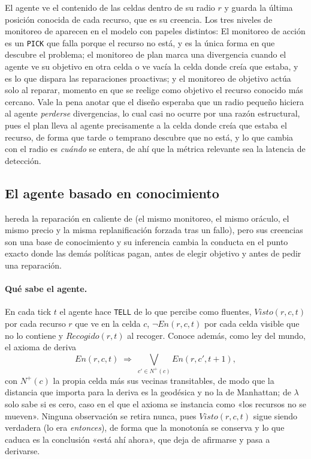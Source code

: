 El agente ve el contenido de las celdas dentro de su radio $r$ y guarda la última posición conocida de cada recurso, que es su creencia. Los tres niveles de monitoreo de \textcite[§11.5.3]{russellNorvig2020} aparecen en el modelo con papeles distintos: El monitoreo de acción es un \texttt{PICK} que falla porque el recurso no está, y es la única forma en que \OL{} descubre el problema; el monitoreo de plan marca una divergencia cuando el agente ve su objetivo en otra celda o ve vacía la celda donde creía que estaba, y es lo que dispara las reparaciones proactivas; y el monitoreo de objetivo actúa solo al reparar, momento en que se reelige como objetivo el recurso conocido más cercano. Vale la pena anotar que el diseño esperaba que un radio pequeño hiciera al agente \emph{perderse} divergencias, lo cual casi no ocurre por una razón estructural, pues el plan lleva al agente precisamente a la celda donde creía que estaba el recurso, de forma que tarde o temprano descubre que no está, y lo que cambia con el radio es \emph{cuándo} se entera, de ahí que la métrica relevante sea la latencia de detección.

\subsection{El agente basado en conocimiento}\label{sec:modelo-kb}

\KB{} hereda la reparación en caliente de \CL{} (el mismo monitoreo, el mismo oráculo, el mismo precio y la misma replanificación forzada tras un fallo), pero sus creencias son una base de conocimiento y su inferencia cambia la conducta en el punto exacto donde las demás políticas pagan, antes de elegir objetivo y antes de pedir una reparación.

\paragraph{Qué sabe el agente.} En cada tick $t$ el agente hace \texttt{TELL} de lo que percibe como fluentes, $\mathit{Visto}(r,c,t)$ por cada recurso $r$ que ve en la celda $c$, $\neg\mathit{En}(r,c,t)$ por cada celda visible que no lo contiene y $\mathit{Recogido}(r,t)$ al recoger. Conoce además, como ley del mundo, el axioma de deriva
\begin{equation}
  \mathit{En}(r,c,t) \;\Rightarrow\; \bigvee_{c' \in N^{+}(c)} \mathit{En}(r,c',t+1),
\end{equation}
con $N^{+}(c)$ la propia celda más sus vecinas transitables, de modo que la distancia que importa para la deriva es la geodésica y no la de Manhattan; de $\lambda$ solo sabe si es cero, caso en el que el axioma se instancia como «los recursos no se mueven». Ninguna observación se retira nunca, pues $\mathit{Visto}(r,c,t)$ sigue siendo verdadera (lo era \emph{entonces}), de forma que la monotonía se conserva y lo que caduca es la conclusión «está ahí ahora», que deja de afirmarse y pasa a derivarse.

